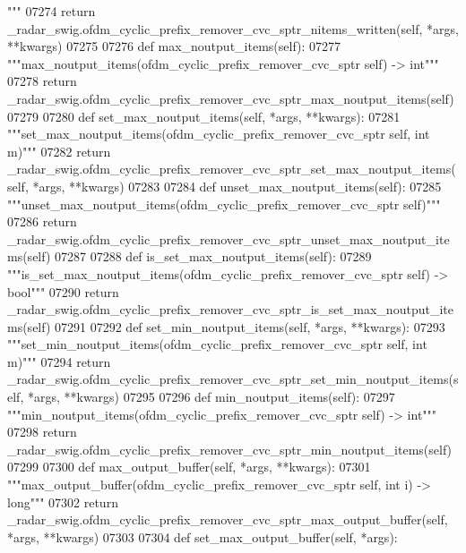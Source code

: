\begin{DoxyCode}
{{{{{{{{{{{{{{{{{{{{{{{{{      """}
07274         \textcolor{keywordflow}{return} \_radar\_swig.ofdm\_cyclic\_prefix\_remover\_cvc\_sptr\_nitems\_written(self, *args, **kwargs)
07275 
07276     \textcolor{keyword}{def }max_noutput_items(self):
07277         \textcolor{stringliteral}{"""max\_noutput\_items(ofdm\_cyclic\_prefix\_remover\_cvc\_sptr self) -> int"""}
07278         \textcolor{keywordflow}{return} \_radar\_swig.ofdm\_cyclic\_prefix\_remover\_cvc\_sptr\_max\_noutput\_items(self)
07279 
07280     \textcolor{keyword}{def }set_max_noutput_items(self, *args, **kwargs):
07281         \textcolor{stringliteral}{"""set\_max\_noutput\_items(ofdm\_cyclic\_prefix\_remover\_cvc\_sptr self, int m)"""}
07282         \textcolor{keywordflow}{return} \_radar\_swig.ofdm\_cyclic\_prefix\_remover\_cvc\_sptr\_set\_max\_noutput\_items(self, *args, **kwargs)
07283 
07284     \textcolor{keyword}{def }unset_max_noutput_items(self):
07285         \textcolor{stringliteral}{"""unset\_max\_noutput\_items(ofdm\_cyclic\_prefix\_remover\_cvc\_sptr self)"""}
07286         \textcolor{keywordflow}{return} \_radar\_swig.ofdm\_cyclic\_prefix\_remover\_cvc\_sptr\_unset\_max\_noutput\_items(self)
07287 
07288     \textcolor{keyword}{def }is_set_max_noutput_items(self):
07289         \textcolor{stringliteral}{"""is\_set\_max\_noutput\_items(ofdm\_cyclic\_prefix\_remover\_cvc\_sptr self) -> bool"""}
07290         \textcolor{keywordflow}{return} \_radar\_swig.ofdm\_cyclic\_prefix\_remover\_cvc\_sptr\_is\_set\_max\_noutput\_items(self)
07291 
07292     \textcolor{keyword}{def }set_min_noutput_items(self, *args, **kwargs):
07293         \textcolor{stringliteral}{"""set\_min\_noutput\_items(ofdm\_cyclic\_prefix\_remover\_cvc\_sptr self, int m)"""}
07294         \textcolor{keywordflow}{return} \_radar\_swig.ofdm\_cyclic\_prefix\_remover\_cvc\_sptr\_set\_min\_noutput\_items(self, *args, **kwargs)
07295 
07296     \textcolor{keyword}{def }min_noutput_items(self):
07297         \textcolor{stringliteral}{"""min\_noutput\_items(ofdm\_cyclic\_prefix\_remover\_cvc\_sptr self) -> int"""}
07298         \textcolor{keywordflow}{return} \_radar\_swig.ofdm\_cyclic\_prefix\_remover\_cvc\_sptr\_min\_noutput\_items(self)
07299 
07300     \textcolor{keyword}{def }max_output_buffer(self, *args, **kwargs):
07301         \textcolor{stringliteral}{"""max\_output\_buffer(ofdm\_cyclic\_prefix\_remover\_cvc\_sptr self, int i) -> long"""}
07302         \textcolor{keywordflow}{return} \_radar\_swig.ofdm\_cyclic\_prefix\_remover\_cvc\_sptr\_max\_output\_buffer(self, *args, **kwargs)
07303 
07304     \textcolor{keyword}{def }set_max_output_buffer(self, *args):
}}}}}}}}}}}}}}}}}}}}}}}}
\end{DoxyCode}
